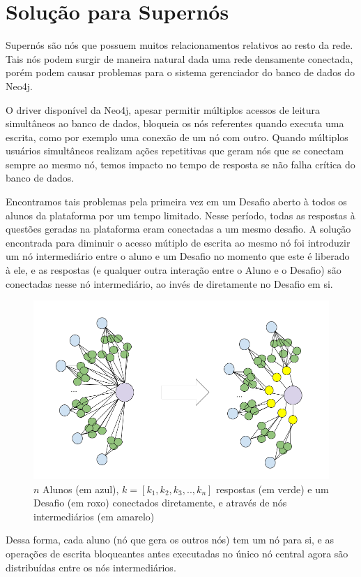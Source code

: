 \section{Solução para Supernós}

Supernós são nós que possuem muitos relacionamentos relativos ao resto da rede. Tais nós podem surgir de maneira natural dada uma rede densamente conectada, porém podem causar problemas para o sistema gerenciador do banco de dados do Neo4j.

O driver disponível da Neo4j, apesar permitir múltiplos acessos de leitura simultâneos ao banco de dados, bloqueia os nós referentes quando executa uma escrita, como por exemplo uma conexão de um nó com outro.
Quando múltiplos usuários simultâneos realizam ações repetitivas que geram nós que se conectam sempre ao mesmo nó, temos impacto no tempo de resposta se não falha crítica do banco de dados.

Encontramos tais problemas pela primeira vez em um Desafio aberto à todos os alunos da plataforma por um tempo limitado. Nesse período, todas as respostas à questões geradas na plataforma eram conectadas a um mesmo desafio. A solução encontrada para diminuir o acesso mútiplo de escrita ao mesmo nó foi introduzir um nó intermediário entre o aluno e um Desafio no momento que este é liberado à ele, e as respostas (e qualquer outra interação entre o Aluno e o Desafio) são conectadas nesse nó intermediário, ao invés de diretamente no Desafio em si.

    \begin{figure}[H]
        \centering
        \includegraphics[width=1.0\linewidth]{Imagens/chap05/AssignedContext.png}
        \caption{\(n\) Alunos (em azul), \(k = [k_1, k_2, k_3, .., k_n]\) respostas (em verde) e um Desafio (em roxo) conectados diretamente, e através de nós intermediários (em amarelo)}
        \label{fig:profile-exemple}
    \end{figure}
Dessa forma, cada aluno (nó que gera os outros nós) tem um nó para si, e as operações de escrita bloqueantes antes executadas no único nó central agora são distribuídas entre os nós intermediários.

